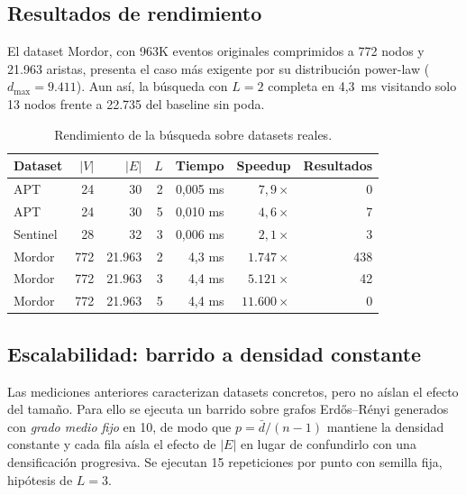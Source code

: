 \documentclass[11pt,a4paper]{article}
\begin{document}
\subsection{Resultados de rendimiento}
El dataset Mordor, con 963K eventos originales comprimidos a 772 nodos y 21.963
aristas, presenta el caso más exigente por su distribución power-law
($d_{\max} = 9.411$). Aun así, la búsqueda con $L = 2$ completa en 4,3~ms
visitando solo 13 nodos frente a 22.735 del baseline sin poda.

\begin{table}[htbp]
\centering
\caption{Rendimiento de la búsqueda sobre datasets reales.}
\begin{tabular}{lrrrrrr}
\toprule
\textbf{Dataset} & $|V|$ & $|E|$ & $L$ & \textbf{Tiempo} & \textbf{Speedup} &
\textbf{Resultados}\\
\midrule
APT      & 24  & 30     & 2 & 0,005 ms & $7{,}9\times$    & 0\\
APT      & 24  & 30     & 5 & 0,010 ms & $4{,}6\times$    & 7\\
Sentinel & 28  & 32     & 3 & 0,006 ms & $2{,}1\times$    & 3\\
Mordor   & 772 & 21.963 & 2 & 4,3 ms   & $1.747\times$  & 438\\
Mordor   & 772 & 21.963 & 3 & 4,4 ms   & $5.121\times$  & 42\\
Mordor   & 772 & 21.963 & 5 & 4,4 ms   & $11.600\times$ & 0\\
\bottomrule
\end{tabular}
\end{table}

\subsection{Escalabilidad: barrido a densidad constante}
\label{sec:escala}
Las mediciones anteriores caracterizan datasets concretos, pero no aíslan el
efecto del tamaño. Para ello se ejecuta un barrido sobre grafos
Erd\H{o}s--Rényi generados con \emph{grado medio fijo} en 10, de modo que
$p = \bar{d}/(n-1)$ mantiene la densidad constante y cada fila aísla el efecto
de $|E|$ en lugar de confundirlo con una densificación progresiva. Se ejecutan
15 repeticiones por punto con semilla fija, hipótesis de $L = 3$.
\end{document}
